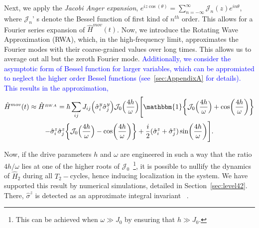 \documentclass[12pt]{iopart}
\newcommand{\blue}[1]{\textcolor{blue}{#1}}
\begin{document}
Next, we apply the \textit{Jacobi Anger expansion}, $\displaystyle e^{iz \cos(\theta)} = \sum_{n=-\infty}^{\infty} \mathcal{J}_n(z) e^{in\theta}$, where $\mathcal{J}_n$' s denote the Bessel function of first kind of $n^{th}$ order. This allows for a Fourier series expansion of $\hat{H}^{mov}(t)$. Now, we introduce the Rotating Wave Approximation (RWA), which, in the high-frequency limit, approximates the Fourier modes with their coarse-grained values over long times. This allows us to average out all but the zeroth Fourier mode. \blue{Additionally, we consider the asymptotic form of Bessel function for larger variables, which can be appromiated to neglect the higher order Bessel functions (see~\ref{sec:AppendixA} for details). This results in the approximation,}
\begin{multline}
    \hat{H}^{mov}(t)\approx \hat{H}^{_{RWA}} = \hbar\sum_{ij} J_{ij} \Big(\hat{\sigma}^y_i\hat{\sigma}^y_j\Big) \mathcal{J}_0\Big(\frac{4h}{\omega}\Big)
    \Bigg[\mathbbm{1}\bigg\{\mathcal{J}_0\Big(\frac{4h}{\omega}\Big) + \cos(\frac{4h}{\omega})\bigg\}\\
    -\hat{\sigma}^z_i\hat{\sigma}^z_j \bigg\{\mathcal{J}_0\Big(\frac{4h}{\omega}\Big)- \cos(\frac{4h}{\omega})\bigg\} + \frac{i}{2} (\hat{\sigma}^z_i + \hat{\sigma}^z_j) \sin(\frac{4h}{\omega})\Bigg].
    \label{eq:movham1}
\end{multline}
	
Now, if the drive parameters $h$ and $\omega$  are {engineered} in such a way that the ratio ${4h}/{\omega}$ lies at one of the higher roots of $\mathcal{J}_0$~\footnote{This can be achieved when $\omega \gg J_0$ by ensuring that $h\gg J_0$.}, it is possible to nullify the dynamics of $\hat{H}_2$ during all $T_2-$cycles, hence inducing localization in the system. We have supported this result by numerical simulations, detailed in Section~\ref{sec:level42}. There, $\hat{\sigma}^z$ is detected as an approximate integral invariant ~\cite{Keser2016,Dodonov1978}. 
\end{document}
